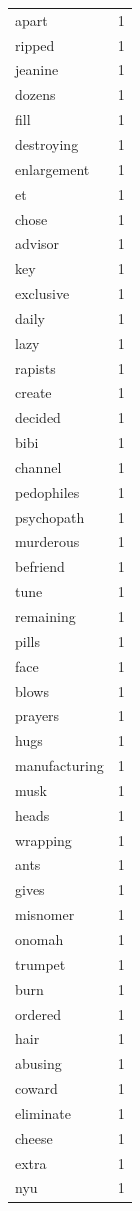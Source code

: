 \begin{tabular}{lr}
apart & 1 \\
ripped & 1 \\
jeanine & 1 \\
dozens & 1 \\
fill & 1 \\
destroying & 1 \\
enlargement & 1 \\
et & 1 \\
chose & 1 \\
advisor & 1 \\
key & 1 \\
exclusive & 1 \\
daily & 1 \\
lazy & 1 \\
rapists & 1 \\
create & 1 \\
decided & 1 \\
bibi & 1 \\
channel & 1 \\
pedophiles & 1 \\
psychopath & 1 \\
murderous & 1 \\
befriend & 1 \\
tune & 1 \\
remaining & 1 \\
pills & 1 \\
face & 1 \\
blows & 1 \\
prayers & 1 \\
hugs & 1 \\
manufacturing & 1 \\
musk & 1 \\
heads & 1 \\
wrapping & 1 \\
ants & 1 \\
gives & 1 \\
misnomer & 1 \\
onomah & 1 \\
trumpet & 1 \\
burn & 1 \\
ordered & 1 \\
hair & 1 \\
abusing & 1 \\
coward & 1 \\
eliminate & 1 \\
cheese & 1 \\
extra & 1 \\
nyu & 1 \\

\end{tabular}
